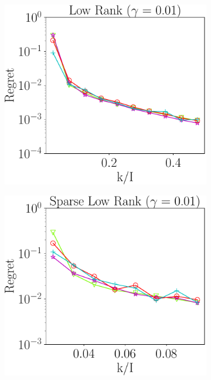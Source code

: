 \begin{figure}
	\centering
	\begin{subfigure}{0.3\textwidth}
		\includegraphics[scale = 0.25]{figure/fig2_lk_lnoise_200.pdf}
	\end{subfigure}
	\begin{subfigure}{0.3\textwidth}
		\includegraphics[scale = 0.25]{figure/fig2_slk_lnoise_200.pdf}
	\end{subfigure}

\end{figure}
